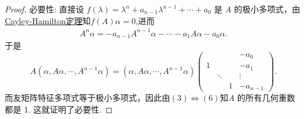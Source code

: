 \documentclass[../../main.tex]{subfiles}
\begin{document}
\begin{proof}
{\heiti 必要性:} 直接设 \( f(\lambda) = \lambda^n + a_{n - 1}\lambda^{n - 1} + \cdots + a_0 \) 是 \( A \) 的极小多项式，由\hyperref[theorem:Cayley-Hamilton定理]{Cayley-Hamilton定理}知$f(A)\alpha =0$,进而
\begin{align*}
A^n\alpha = -a_{n-1}A^{n-1}\alpha-\cdots-a_1A\alpha-a_0\alpha.
\end{align*}
于是
\[
A(\alpha, A\alpha, \cdots, A^{n - 1}\alpha) = (\alpha, A\alpha, \cdots, A^{n - 1}\alpha) \begin{pmatrix}
& & & -a_0 \\
1 & & & -a_1 \\
& \ddots & & \vdots \\
& & 1 & -a_{n - 1}
\end{pmatrix}.
\]
而友矩阵特征多项式等于极小多项式，因此由\((3)\Leftrightarrow(6)\)知\( A \) 的所有几何重数都是 1. 这就证明了必要性.

\end{proof}
\end{document}
